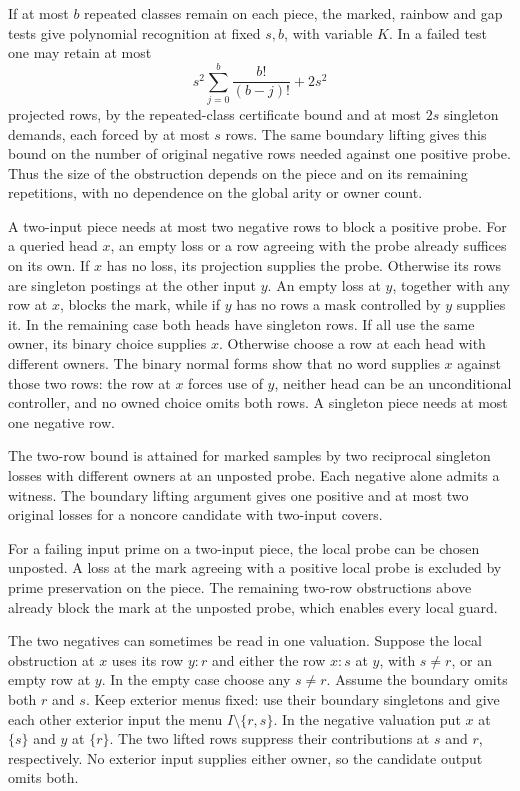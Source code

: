 If at most $b$ repeated classes remain on
each piece, the marked, rainbow and gap
tests give polynomial recognition at
fixed $s,b$, with variable $K$. In a failed
test one may retain at most
\[
 s^2\sum_{j=0}^{b}\frac{b!}{(b-j)!}+2s^2
\]
projected rows, by the repeated-class
certificate bound and at most $2s$
singleton demands, each forced by at
most $s$ rows. The same boundary lifting
gives this bound on the number of original
negative rows needed against one positive
probe. Thus the size of the obstruction
depends on the piece and on its remaining
repetitions, with no dependence on the
global arity or owner count.

A two-input piece needs at most two negative
rows to block a positive probe. For a queried
head $x$, an empty loss or a row agreeing
with the probe already suffices on its own.
If $x$ has no loss, its projection supplies
the probe. Otherwise its rows are singleton
postings at the other input $y$. An empty
loss at $y$, together with any row at $x$,
blocks the mark, while if $y$ has no rows
a mask controlled by $y$ supplies it.
In the remaining case both heads have
singleton rows. If all use the same owner,
its binary choice supplies $x$. Otherwise
choose a row at each head with different
owners. The binary normal forms show that
no word supplies $x$ against those two
rows: the row at $x$ forces use of $y$,
neither head can be an unconditional
controller, and no owned choice omits
both rows. A singleton piece needs at
most one negative row.

The two-row bound is attained for marked
samples by two reciprocal singleton losses
with different owners at an unposted probe.
Each negative alone admits a witness.
The boundary lifting argument gives one
positive and at most two original losses
for a noncore candidate with two-input
covers.

For a failing input prime on a two-input piece,
the local probe can be chosen unposted. A loss
at the mark agreeing with a positive local
probe is excluded by prime preservation on
the piece. The remaining two-row obstructions
above already block the mark at the unposted
probe, which enables every local guard.

The two negatives can sometimes be read in
one valuation. Suppose the local obstruction
at $x$ uses its row $y:r$ and either the row
$x:s$ at $y$, with $s\ne r$, or an empty
row at $y$. In the empty case choose any
$s\ne r$. Assume the boundary omits both
$r$ and $s$. Keep exterior menus fixed:
use their boundary singletons and give
each other exterior input the menu
$I\setminus\{r,s\}$. In the negative
valuation put $x$ at $\{s\}$ and $y$
at $\{r\}$. The two lifted rows suppress
their contributions at $s$ and $r$,
respectively. No exterior input supplies
either owner, so the candidate output
omits both.

